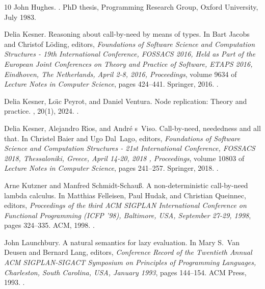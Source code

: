 \documentclass[10pt,a4paper]{article}
\theoremstyle{remark}
\begin{document}
\begin{thebibliography}{10}
John Hughes.
.
\newblock PhD thesis, Programming Research Group, Oxford University, July 1983.

Delia Kesner.
\newblock Reasoning about call-by-need by means of types.
\newblock In Bart Jacobs and Christof L{\"{o}}ding, editors, {\em Foundations
  of Software Science and Computation Structures - 19th International
  Conference, {FOSSACS } 2016, Held as Part of the European Joint Conferences
  on Theory and Practice of Software, { ETAPS} 2016, Eindhoven, The
  Netherlands, April 2-8, 2016, Proceedings}, volume 9634 of {\em Lecture Notes
  in Computer Science}, pages 424--441. Springer, 2016.
\newblock \href {https://doi.org/10.1007/978-3-662-49630-5\_25}
  {}.

Delia Kesner, Lo{\"{\i}}c Peyrot, and Daniel Ventura.
\newblock Node replication: Theory and practice.
, 20(1), 2024.
\newblock \href {https://doi.org/10.46298/LMCS-20(1:5)2024}
  {}.

Delia Kesner, Alejandro R{\'{\i}}os, and Andr{\'{e}} s~Viso.
\newblock Call-by-need, neededness and all that.
\newblock In Christel Baier and Ugo Dal~Lago, editors, {\em Foundations of
  Software Science and Computation Structures - 21st International Conference,
  {FOSSACS } 2018, Thessaloniki, Greece, April 14-20, 2018 , Proceedings},
  volume 10803 of {\em Lecture Notes in Computer Science}, pages 241--257.
  Springer, 2018.
\newblock \href {https://doi.org/10.1007/978-3-319-89366-2\_13}
  {}.

Arne Kutzner and Manfred Schmidt{-}Schau{\ss}.
\newblock A non-deterministic call-by-need lambda calculus.
\newblock In Matthias Felleisen, Paul Hudak, and Christian Queinnec, editors,
  {\em Proceedings of the third {ACM} {SIGPLAN} International Conference on
  Functional Programming {(ICFP} '98), Baltimore, USA, September 27-29, 1998},
  pages 324--335. {ACM}, 1998.
\newblock \href {https://doi.org/10.1145/289423.289462}
  {}.

John Launchbury.
\newblock A natural semantics for lazy evaluation.
\newblock In Mary S.~Van Deusen and Bernard Lang, editors, {\em Conference
  Record of the Twentieth Annual {ACM} { SIGPLAN-SIGACT} Symposium on
  Principles of Programming Languages, Charleston, South Carolina, USA, January
  1993}, pages 144--154. {ACM} Press, 1993.
\newblock \href {https://doi.org/10.1145/158511.158618}
  {}.


\end{thebibliography}
\end{document}
